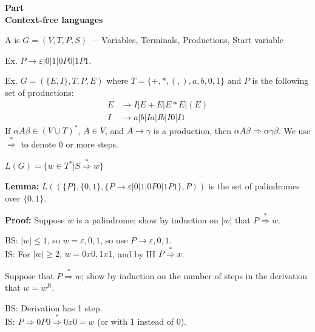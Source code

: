 
\newcommand{\mytitle}{Computational Foundations: Context-Free Languages}
\newcommand{\mychpnr}{9}


\begin{frame}
\begin{center}
\addtocounter{part}{1}
{\bf Part  \\ Context-free languages}
\end{center}
\end{frame}

\begin{frame}
A  is $G=(V,T,P,S)$
--- Variables, Terminals, Productions, Start variable

Ex. $P\longrightarrow\varepsilon|0|1|0P0|1P1$.

Ex. $G=(\{E,I\},T,P,E)$ where $T=\{+,*,(,),a,b,0,1\}$ and $P$ is the
following set of productions:
\begin{align*}
E & \longrightarrow I|E+E|E*E|(E) \\
I & \longrightarrow a|b|Ia|Ib|I0|I1
\end{align*}
If $\alpha A\beta\in(V\cup T)^*$, $A\in V$, and
$A\longrightarrow\gamma$ is a production, then $\alpha
A\beta\Rightarrow\alpha\gamma\beta$.  We use
$\stackrel{*}{\Rightarrow}$ to denote 0 or more steps.

$L(G)=\{w\in T^*|S\stackrel{*}{\Rightarrow}w\}$
\end{frame}

\begin{frame}

{\bf Lemma:}
$L((\{P\},\{0,1\},\{P\longrightarrow\varepsilon|0|1|0P0|1P1\},P))$ is
the set of palindromes over $\{0,1\}$.

{\bf Proof:} Suppose $w$ is a palindrome; show by induction on $|w|$
that $P\stackrel{*}{\Rightarrow}w$.

BS: $|w|\le 1$, so $w=\varepsilon,0,1$, so use
$P\longrightarrow\varepsilon,0,1$.  \\
IS: For $|w|\ge 2$, $w=0x0,1x1$, and
by IH $P\stackrel{*}{\Rightarrow}x$.

Suppose that $P\stackrel{*}{\Rightarrow}w$; show by induction on the
number of steps in the derivation that $w=w^R$.

BS: Derivation has 1 step. \\ 
IS: $P\Rightarrow 0P0\stackrel{*}{\Rightarrow}0x0=w$ (or with 1 instead of 0).
\end{frame}

